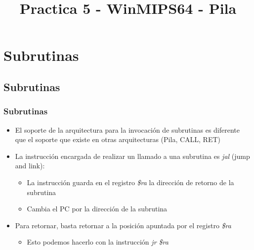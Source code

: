 \documentclass{beamer}
\title{Practica 5 - WinMIPS64 - Pila}
\begin{document}
\begin{frame}
\titlepage
\end{frame}

\section{Subrutinas}
\subsection{Subrutinas}
\begin{frame}
\frametitle{Subrutinas}
\begin{itemize}
\item El soporte de la arquitectura para la invocación de subrutinas es diferente que el soporte que existe en otras arquitecturas (Pila, CALL, RET)
\item La instrucción encargada de realizar un llamado a una subrutina es \emph{jal} (jump and link):
\begin{itemize}
\item La instrucción guarda en el registro \emph{\$ra} la dirección de retorno de la subrutina
\item Cambia el PC por la dirección de la subrutina
\end{itemize}
\item Para retornar, basta retornar a la posición apuntada por el registro \emph{\$ra}
    \begin{itemize}
    \item Esto podemos hacerlo con la instrucción \emph{jr \$ra}
    \end{itemize}
\end{itemize}
\end{frame}
\end{document}
